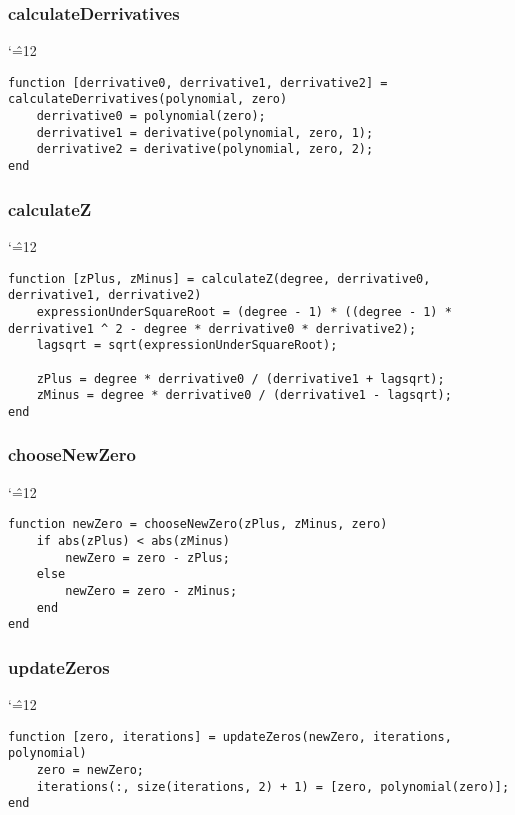 \documentclass[12pt]{report}
\newenvironment{simplechar}{%
   \catcode`\^=12
}{}
\begin{document}
\newpage
\subsubsection{calculateDerrivatives}
\begin{simplechar}
\begin{lstlisting}
function [derrivative0, derrivative1, derrivative2] = calculateDerrivatives(polynomial, zero)
    derrivative0 = polynomial(zero);
    derrivative1 = derivative(polynomial, zero, 1);
    derrivative2 = derivative(polynomial, zero, 2);
end
\end{lstlisting}
\end{simplechar}

\subsubsection{calculateZ}
\begin{simplechar}
\begin{lstlisting}
function [zPlus, zMinus] = calculateZ(degree, derrivative0, derrivative1, derrivative2)
    expressionUnderSquareRoot = (degree - 1) * ((degree - 1) * derrivative1 ^ 2 - degree * derrivative0 * derrivative2);
    lagsqrt = sqrt(expressionUnderSquareRoot);

    zPlus = degree * derrivative0 / (derrivative1 + lagsqrt);
    zMinus = degree * derrivative0 / (derrivative1 - lagsqrt);
end
\end{lstlisting}
\end{simplechar}

\subsubsection{chooseNewZero}
\begin{simplechar}
\begin{lstlisting}
function newZero = chooseNewZero(zPlus, zMinus, zero)
    if abs(zPlus) < abs(zMinus)
        newZero = zero - zPlus;
    else
        newZero = zero - zMinus;
    end
end
\end{lstlisting}
\end{simplechar}

\newpage
\subsubsection{updateZeros}
\begin{simplechar}
\begin{lstlisting}
function [zero, iterations] = updateZeros(newZero, iterations, polynomial)
    zero = newZero;
    iterations(:, size(iterations, 2) + 1) = [zero, polynomial(zero)];
end
\end{lstlisting}
\end{simplechar}
\end{document}
